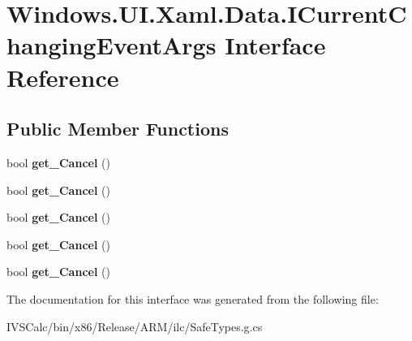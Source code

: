 \hypertarget{interface_windows_1_1_u_i_1_1_xaml_1_1_data_1_1_i_current_changing_event_args}{}\section{Windows.\+U\+I.\+Xaml.\+Data.\+I\+Current\+Changing\+Event\+Args Interface Reference}
\label{interface_windows_1_1_u_i_1_1_xaml_1_1_data_1_1_i_current_changing_event_args}
\subsection*{Public Member Functions}
\begin{DoxyCompactItemize}
\item 
\mbox{\label{interface_windows_1_1_u_i_1_1_xaml_1_1_data_1_1_i_current_changing_event_args_a0dfbe0bc6a8df825071295ad7179de8a}} 
bool {\bfseries get\+\_\+\+Cancel} ()
\item 
\mbox{\label{interface_windows_1_1_u_i_1_1_xaml_1_1_data_1_1_i_current_changing_event_args_a0dfbe0bc6a8df825071295ad7179de8a}} 
bool {\bfseries get\+\_\+\+Cancel} ()
\item 
\mbox{\label{interface_windows_1_1_u_i_1_1_xaml_1_1_data_1_1_i_current_changing_event_args_a0dfbe0bc6a8df825071295ad7179de8a}} 
bool {\bfseries get\+\_\+\+Cancel} ()
\item 
\mbox{\label{interface_windows_1_1_u_i_1_1_xaml_1_1_data_1_1_i_current_changing_event_args_a0dfbe0bc6a8df825071295ad7179de8a}} 
bool {\bfseries get\+\_\+\+Cancel} ()
\item 
\mbox{\label{interface_windows_1_1_u_i_1_1_xaml_1_1_data_1_1_i_current_changing_event_args_a0dfbe0bc6a8df825071295ad7179de8a}} 
bool {\bfseries get\+\_\+\+Cancel} ()
\end{DoxyCompactItemize}


The documentation for this interface was generated from the following file\+:\begin{DoxyCompactItemize}
\item 
I\+V\+S\+Calc/bin/x86/\+Release/\+A\+R\+M/ilc/Safe\+Types.\+g.\+cs\end{DoxyCompactItemize}
